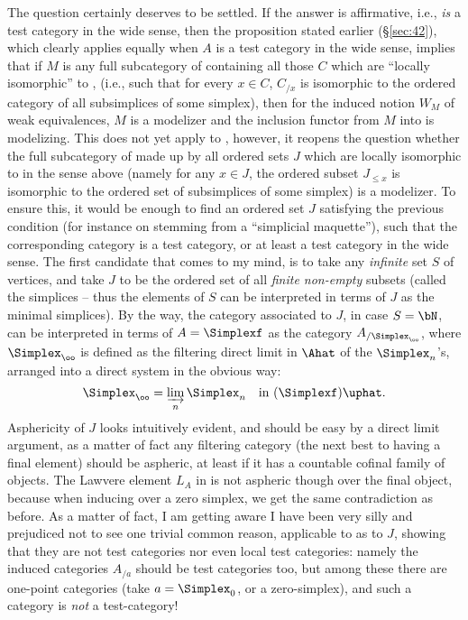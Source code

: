 The question certainly deserves to be settled. If the answer is
affirmative, i.e., \Simplexf{} \emph{is} a test category in the wide
sense, then the proposition stated earlier (\S \ref{sec:42}), which clearly applies equally when $A$ is a
test category in the wide sense, implies that if $M$ is any full
subcategory of \Cat{} containing all those $C$ which are ``locally
isomorphic'' to \Simplexf, (i.e., such that for every $x\in C$, $C_{/x}$
is isomorphic to the ordered category of all subsimplices of some
simplex), then for the induced notion $W_M$ of weak equivalences, $M$
is a modelizer and the inclusion functor from $M$ into \Cat{} is
modelizing. This does not yet apply to \Ord, however, it reopens the
question whether the full subcategory of \Ord{} made up by all ordered
sets $J$ which are locally isomorphic to \Simplexf{} in the sense above
(namely for any $x\in J$, the ordered subset $J_{\le x}$ is
isomorphic to the ordered set of subsimplices of some
simplex) is a modelizer. To ensure this, it would be enough to find an
ordered set $J$ satisfying the previous condition (for instance on
stemming from a ``simplicial maquette''), such that the corresponding
category is a test category, or at least a test category in the wide
sense. The first candidate that comes to my mind, is to take any
\emph{infinite} set $S$ of vertices, and take $J$ to be the ordered
set of all \emph{finite non-empty} subsets (called the simplices --
thus the elements of $S$ can be interpreted in terms of $J$ as the
minimal simplices). By the way, the category associated to $J$, in
case $S=\bN$, can be interpreted in terms of $A=\Simplexf$ as the
category $A_{/\Simplex_\oo}$, where $\Simplex_\oo$ is defined as the
filtering direct limit in $\Ahat$ of the $\Simplex_n$'s, arranged into a
direct system in the obvious way:
\[\Simplex_\oo = \varinjlim_n \Simplex_n\quad \text{in
  $(\Simplexf)\uphat$.}\]
Asphericity of $J$ looks intuitively evident, and should be easy by a
direct limit argument, as a matter of fact any filtering category (the
next best to having a final element) should be aspheric, at least if
it has a countable cofinal family of objects. The Lawvere element
$L_A$ in \Ahat{} is not aspheric though over the final object, because
when inducing over a zero simplex, we get the same contradiction as
before. As a matter of fact, I am getting aware I have been very silly
and prejudiced not to see one trivial common reason, applicable to
\Simplexf{} as to $J$, showing that they are not test categories nor
even local test categories: namely the induced categories $A_{/a}$
should be test categories too, but among these there are one-point
categories (take $a=\Simplex_0$, or a zero-simplex), and such a category
is \emph{not} a test-category!

